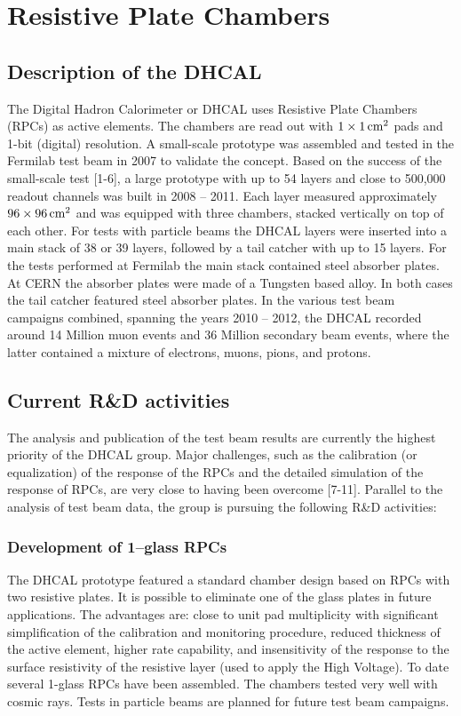 \section{Resistive Plate Chambers}

\subsection{Description of the DHCAL}
The Digital Hadron Calorimeter or DHCAL uses Resistive Plate Chambers (RPCs) as active elements. The chambers are read out with $\unit[1 \times 1]{cm^2}$ pads and 1-bit (digital) resolution. A small-scale prototype was assembled and tested in the Fermilab test beam in 2007 to validate the concept.
Based on the success of the small-scale test [1-6], a large prototype with up to 54 layers and close to 500,000 readout channels was built in 2008 -- 2011. Each layer measured approximately $\unit[96 \times 96]{cm^2}$ and was equipped with three chambers, stacked vertically on top of each other.
For tests with particle beams the DHCAL layers were inserted into a main stack of 38 or 39 layers, followed by a tail catcher with up to 15 layers. For the tests performed at Fermilab the main stack contained steel absorber plates. At CERN the absorber plates were made of a Tungsten based alloy. In both cases the tail catcher featured steel absorber plates.
In the various test beam campaigns combined, spanning the years 2010 -- 2012, the DHCAL recorded around 14 Million muon events and 36 Million secondary beam events, where the latter contained a mixture of electrons, muons, pions, and protons.
\subsection{Current R\&D activities}
The analysis and publication of the test beam results are currently the highest priority of the DHCAL group. Major challenges, such as the calibration (or equalization) of the response of the RPCs and the detailed simulation of the response of RPCs, are very close to having been overcome [7-11].
Parallel to the analysis of test beam data, the group is pursuing the following R\&D activities:
\subsubsection{Development of 1--glass RPCs}
The DHCAL prototype featured a standard chamber design based on RPCs with two resistive plates. It is possible to eliminate one of the glass plates in future applications. The advantages are: close to unit pad multiplicity with significant simplification of the calibration and monitoring procedure, reduced thickness of the active element, higher rate capability, and insensitivity of the response to the surface resistivity of the resistive layer (used to apply the High Voltage). To date several 1-glass RPCs have been assembled. The chambers tested very well with cosmic rays. Tests in particle beams are planned for future test beam campaigns.
